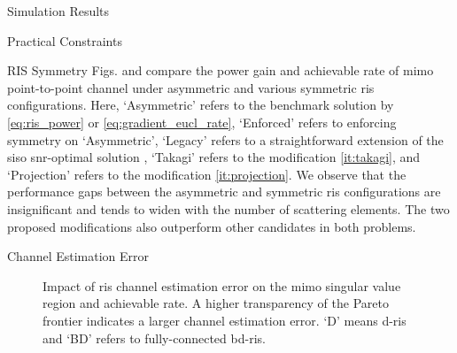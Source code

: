 \documentclass[journal]{IEEEtran}
\begin{document}
\begin{section}{Simulation Results}
\begin{subsection}{Practical Constraints}
\begin{subsubsection}{RIS Symmetry}
			Figs.  and  compare the power gain and achievable rate of \gls{mimo} point-to-point channel under asymmetric and various symmetric \gls{ris} configurations.
			Here, `Asymmetric' refers to the benchmark solution by \eqref{eq:ris_power} or \eqref{eq:gradient_eucl_rate}, `Enforced' refers to enforcing symmetry on `Asymmetric', `Legacy' refers to a straightforward extension of the \gls{siso} \gls{snr}-optimal solution \cite[(6)]{Santamaria2023}, `Takagi' refers to the modification \ref{it:takagi}, and `Projection' refers to the modification \ref{it:projection}.
			We observe that the performance gaps between the asymmetric and symmetric \gls{ris} configurations are insignificant and tends to widen with the number of scattering elements.
			The two proposed modifications also outperform other candidates in both problems.
		\end{subsubsection}

		\begin{subsubsection}{Channel Estimation Error}
			\label{sc:estimation_error}
			\begin{figure}[!t]
				\centering
				\caption{
					Impact of \gls{ris} channel estimation error on the \gls{mimo} singular value region and achievable rate.
					A higher transparency of the Pareto frontier indicates a larger channel estimation error.
					`D' means \gls{d}-\gls{ris} and `BD' refers to fully-connected \gls{bd}-\gls{ris}.
				}
			\end{figure}


\end{subsubsection}
\end{subsection}
\end{section}
\end{document}
